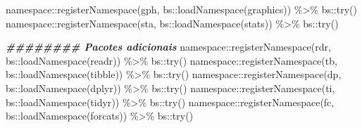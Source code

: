 \documentclass[
]{article}
\newenvironment{Shaded}{\begin{snugshade}}{\end{snugshade}}
\newcommand{\DocumentationTok}[1]{\textcolor[rgb]{0.56,0.35,0.01}{\textbf{\textit{#1}}}}
\newcommand{\FunctionTok}[1]{\textcolor[rgb]{0.00,0.00,0.00}{#1}}
\newcommand{\NormalTok}[1]{#1}
\newcommand{\SpecialCharTok}[1]{\textcolor[rgb]{0.00,0.00,0.00}{#1}}
\newcommand{\StringTok}[1]{\textcolor[rgb]{0.31,0.60,0.02}{#1}}
\begin{document}
\begin{Shaded}
\begin{Highlighting}[]
\NormalTok{namespace}\SpecialCharTok{::}\FunctionTok{registerNamespace}\NormalTok{(}\StringTok{\textquotesingle{}gph\textquotesingle{}}\NormalTok{, bs}\SpecialCharTok{::}\FunctionTok{loadNamespace}\NormalTok{(}\StringTok{\textquotesingle{}graphics\textquotesingle{}}\NormalTok{)) }\SpecialCharTok{\%\textgreater{}\%}\NormalTok{ bs}\SpecialCharTok{::}\FunctionTok{try}\NormalTok{()}
\NormalTok{namespace}\SpecialCharTok{::}\FunctionTok{registerNamespace}\NormalTok{(}\StringTok{\textquotesingle{}sta\textquotesingle{}}\NormalTok{, bs}\SpecialCharTok{::}\FunctionTok{loadNamespace}\NormalTok{(}\StringTok{\textquotesingle{}stats\textquotesingle{}}\NormalTok{)) }\SpecialCharTok{\%\textgreater{}\%}\NormalTok{ bs}\SpecialCharTok{::}\FunctionTok{try}\NormalTok{()}


\DocumentationTok{\#\#\#\#\#\#\#\# Pacotes adicionais}
\NormalTok{namespace}\SpecialCharTok{::}\FunctionTok{registerNamespace}\NormalTok{(}\StringTok{\textquotesingle{}rdr\textquotesingle{}}\NormalTok{, bs}\SpecialCharTok{::}\FunctionTok{loadNamespace}\NormalTok{(}\StringTok{\textquotesingle{}readr\textquotesingle{}}\NormalTok{)) }\SpecialCharTok{\%\textgreater{}\%}\NormalTok{ bs}\SpecialCharTok{::}\FunctionTok{try}\NormalTok{()}
\NormalTok{namespace}\SpecialCharTok{::}\FunctionTok{registerNamespace}\NormalTok{(}\StringTok{\textquotesingle{}tb\textquotesingle{}}\NormalTok{, bs}\SpecialCharTok{::}\FunctionTok{loadNamespace}\NormalTok{(}\StringTok{\textquotesingle{}tibble\textquotesingle{}}\NormalTok{)) }\SpecialCharTok{\%\textgreater{}\%}\NormalTok{ bs}\SpecialCharTok{::}\FunctionTok{try}\NormalTok{()}
\NormalTok{namespace}\SpecialCharTok{::}\FunctionTok{registerNamespace}\NormalTok{(}\StringTok{\textquotesingle{}dp\textquotesingle{}}\NormalTok{, bs}\SpecialCharTok{::}\FunctionTok{loadNamespace}\NormalTok{(}\StringTok{\textquotesingle{}dplyr\textquotesingle{}}\NormalTok{)) }\SpecialCharTok{\%\textgreater{}\%}\NormalTok{ bs}\SpecialCharTok{::}\FunctionTok{try}\NormalTok{()}
\NormalTok{namespace}\SpecialCharTok{::}\FunctionTok{registerNamespace}\NormalTok{(}\StringTok{\textquotesingle{}ti\textquotesingle{}}\NormalTok{, bs}\SpecialCharTok{::}\FunctionTok{loadNamespace}\NormalTok{(}\StringTok{\textquotesingle{}tidyr\textquotesingle{}}\NormalTok{)) }\SpecialCharTok{\%\textgreater{}\%}\NormalTok{ bs}\SpecialCharTok{::}\FunctionTok{try}\NormalTok{()}
\NormalTok{namespace}\SpecialCharTok{::}\FunctionTok{registerNamespace}\NormalTok{(}\StringTok{\textquotesingle{}fc\textquotesingle{}}\NormalTok{, bs}\SpecialCharTok{::}\FunctionTok{loadNamespace}\NormalTok{(}\StringTok{\textquotesingle{}forcats\textquotesingle{}}\NormalTok{)) }\SpecialCharTok{\%\textgreater{}\%}\NormalTok{ bs}\SpecialCharTok{::}\FunctionTok{try}\NormalTok{()}

\end{Highlighting}
\end{Shaded}
\end{document}
